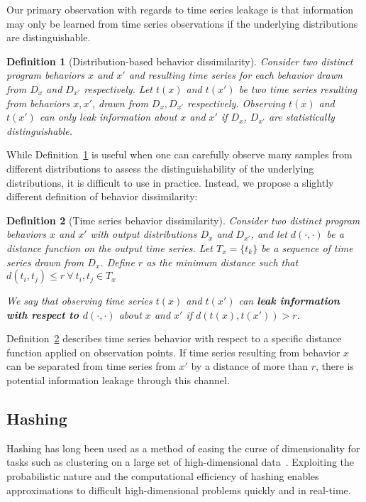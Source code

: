 \documentclass[a4paper]{article}
\theoremstyle{def}
\newtheorem{definition}{Definition}
\theoremstyle{thm}
\begin{document}
Our primary observation with regards to time series leakage is that information may only be learned from time series observations if the underlying distributions are distinguishable.

\begin{definition}[Distribution-based behavior dissimilarity]\label{defn:dist_leakage}
    Consider two distinct program behaviors $x$ and $x'$ and resulting time series for each behavior drawn from $D_x$ and $D_{x'}$ respectively.
    Let $t(x)$ and $t(x')$ be two time series resulting from behaviors $x, x'$, drawn from $D_x, D_{x'}$ respectively.
    Observing $t(x)$ and $t(x')$ can only leak information about $x$ and $x'$ if $D_x$, $D_{x'}$ are statistically distinguishable.
\end{definition}

While Definition~\ref{defn:dist_leakage} is useful when one can carefully observe many samples from different distributions to assess the distinguishability of the underlying distributions, it is difficult to use in practice.
Instead, we propose a slightly different definition of behavior dissimilarity:

\begin{definition}[Time series behavior dissimilarity]\label{defn:leakage}
    Consider two distinct program behaviors $x$ and $x'$ with output distributions $D_x$ and $D_{x'}$, and let $d(\cdot,\cdot)$ be a distance function on the output time series.
    Let $T_x = \{t_k\}$ be a sequence of time series drawn from $D_x$.
    Define $r$ as the minimum distance such that $d(t_i, t_j) \le r~\forall~t_i,t_j \in T_x$

    We say that observing time series $t(x)$ and $t(x')$ can \textbf{leak information with respect to $d(\cdot,\cdot)$} about $x$ and $x'$ if $d(t(x),t(x')) > r$.
\end{definition}

Definition~\ref{defn:leakage} describes time series behavior with respect to a specific distance function applied on observation points.
If time series resulting from behavior $x$ can be separated from time series from $x'$ by a distance of more than $r$, there is potential information leakage through this channel.

\subsection{Hashing}
\label{subsec:hashing}
Hashing has long been used as a method of easing the curse of dimensionality for tasks such as clustering on a large set of high-dimensional data~\cite{Indyk98-ANN,Gionis99-SSH,Datar04-LSH}.
Exploiting the probabilistic nature and the computational efficiency of hashing enables approximations to difficult high-dimensional problems quickly and in real-time.
\end{document}
